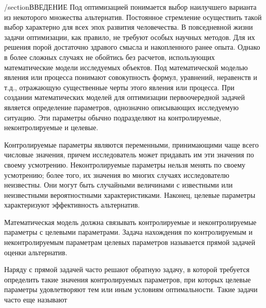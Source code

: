 /section{ВВЕДЕНИЕ}
	Под оптимизацией понимается выбор наилучшего варианта из некоторого множества альтернатив. Постоянное стремление осуществить такой выбор характерно для всех эпох развития человечества. В повседневной жизни задачи оптимизации, как правило, не требуют особых научных методов. Для их решения порой достаточно здравого смысла и накопленного ранее опыта. Однако в более сложных случаях не обойтись без расчетов, использующих математические модели исследуемых объектов. Под математической моделью явления или процесса понимают совокупность формул, уравнений, неравенств и т.д., отражающую существенные черты этого явления или процесса. При создании математических моделей для оптимизации первоочередной задачей является определение параметров, однозначно описывающих исследуемую ситуацию. Эти параметры обычно подразделяют на контролируемые, неконтролируемые и целевые.


	{Контролируемые параметры}  являются переменными, принимающими чаще всего числовые значения, причем исследователь может придавать им эти значения по своему усмотрению. 
{Неконтролируемые параметры}  нельзя менять по своему усмотрению; более того, их значения во многих случаях исследователю неизвестны. Они могут быть случайными величинами с известными или неизвестными вероятностными характеристиками. Наконец, {целевые параметры} характеризуют эффективность альтернатив.

	Математическая модель должна связывать контролируемые и неконтролируемые параметры с целевыми параметрами. Задача нахождения по контролируемым и  неконтролируемым параметрам целевых параметров называется {прямой задачей} оценки альтернатив.

	Наряду с прямой задачей часто решают {обратную задачу,} в которой требуется определить такие значения контролируемых параметров, при которых целевые параметры  удовлетворяют тем или иным условиям оптимальности. Такие задачи часто  еще называют 